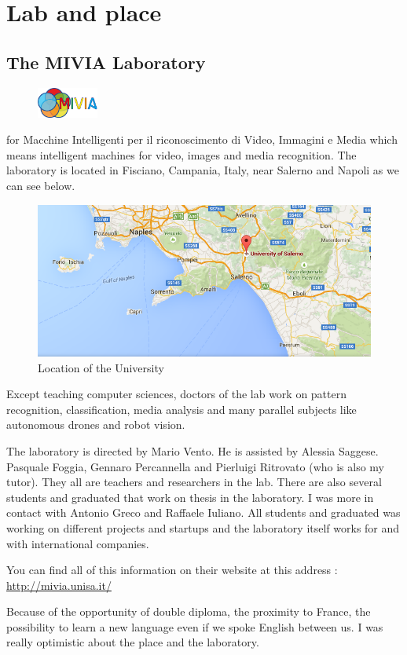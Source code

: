 \chapter{Lab and place}
\section{The MIVIA Laboratory}

\begin{figure}
	\vspace{-7mm}
	\includegraphics[width=2cm]{images_not_compressed/MIVIALogo.jpg}
	\end{figure}
 for Macchine Intelligenti per il riconoscimento di Video, Immagini e Media which means intelligent machines for video, images and media recognition. The laboratory is located in Fisciano, Campania, Italy, near Salerno and Napoli as we can see below.
 \begin{figure}[h]
 \begin{center}
	 \includegraphics[width=12cm]{images_not_compressed/geoUniversity.png}
		\caption{Location of the University}
	 \end{center}
 \end{figure}
 \par Except teaching computer sciences, doctors of the lab work on pattern recognition, classification, media analysis and many parallel subjects like autonomous drones and robot vision.
 \par The laboratory is directed by Mario Vento. He is assisted by Alessia Saggese. Pasquale Foggia, Gennaro Percannella and Pierluigi Ritrovato (who is also my tutor). They all are teachers and researchers in the lab. There are also several students and graduated that work on thesis in the laboratory. I was more in contact with Antonio Greco and Raffaele Iuliano. All students and graduated was working on different projects and startups and the laboratory itself works for and with international companies.
 \par You can find all of this information on their website at this address : \url{http://mivia.unisa.it/}
 \par Because of the opportunity of double diploma, the proximity to France, the possibility to learn a new language even if we spoke English between us. I was really optimistic about the place and the laboratory.
	 
